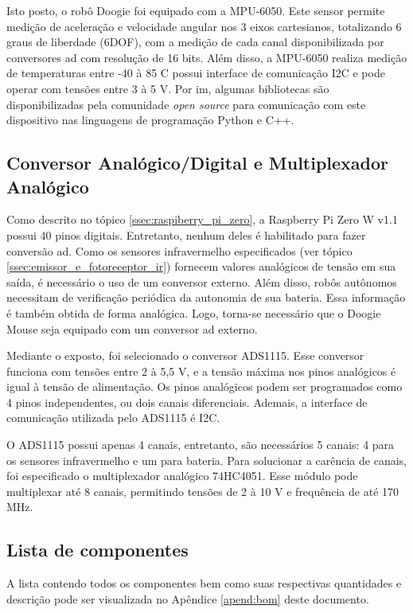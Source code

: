 Isto posto, o robô Doogie foi equipado com a MPU-6050. Este sensor permite medição de aceleração e velocidade angular nos 3 eixos cartesianos, totalizando 6 graus de liberdade (6DOF), com a medição de cada canal disponibilizada por conversores \gls*{ad} com resolução de 16 bits. Além disso, a MPU-6050 realiza medição de temperaturas entre -40 à 85 \textdegree C possui interface de comunicação I2C e pode operar com tensões entre 3 à 5 V. Por im, algumas bibliotecas são disponibilizadas pela comunidade \textit{open source} para comunicação com este dispositivo nas linguagens de programação Python e C++.

\subsection{Conversor Analógico/Digital e Multiplexador Analógico}
\label{conversor_multiplexador_analogico}
Como descrito no tópico \ref{ssec:raspiberry_pi_zero}, a Raspberry Pi Zero W v1.1 possui 40 pinos digitais. Entretanto, nenhum deles é habilitado para fazer conversão \gls*{ad}. Como os sensores infravermelho especificados (ver tópico \ref{ssec:emissor_e_fotoreceptor_ir}) fornecem valores analógicos de tensão em sua saída, é necessário o uso de um conversor externo. Além disso, robôs autônomos necessitam de verificação periódica da autonomia de sua bateria. Essa informação é também obtida de forma analógica. Logo, torna-se necessário que o Doogie Mouse seja equipado com um conversor \gls*{ad} externo.

Mediante o exposto, foi selecionado o conversor ADS1115. Esse conversor funciona com tensões entre 2 à 5,5 V, e a tensão máxima nos pinos analógicos é igual à tensão de alimentação. Os pinos analógicos podem ser programados como 4 pinos independentes, ou dois canais diferenciais. Ademais, a interface de comunicação utilizada pelo ADS1115 é I2C.

O ADS1115 possui apenas 4 canais, entretanto, são necessários 5 canais: 4 para os sensores infravermelho e um para bateria. Para solucionar a carência de canais, foi especificado o multiplexador analógico 74HC4051. Esse módulo pode multiplexar até 8 canais, permitindo tensões de 2 à 10 V e frequência de até 170 MHz.

\subsection{Lista de componentes}
\label{ssec:bom}
A lista contendo todos os componentes bem como suas respectivas quantidades e descrição pode ser visualizada no Apêndice \ref{apend:bom} deste documento.

